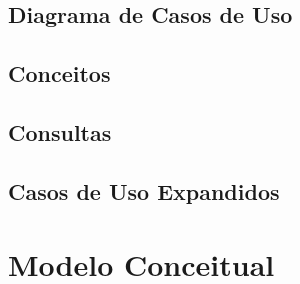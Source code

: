 \documentclass[12pt,a4paper]{article}
\begin{document}
	        	\subsection{Diagrama de Casos de Uso}
	        	\subsection{Conceitos}
	        	\subsection{Consultas}
	        	\subsection{Casos de Uso Expandidos}
        	
        	\newpage
        	\section{Modelo Conceitual}
        	
        	
        	
\end{document}
